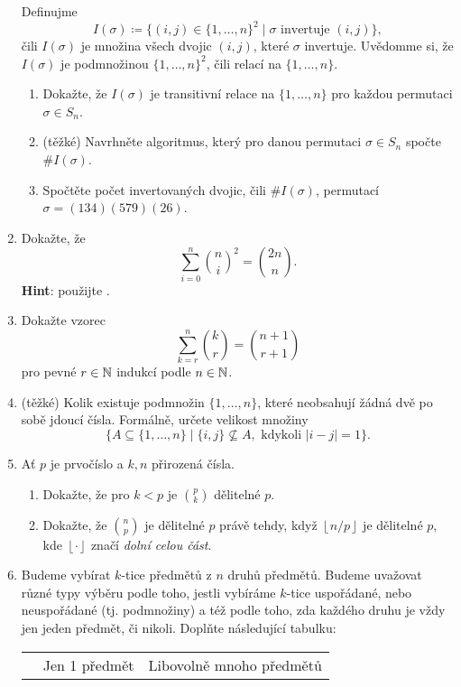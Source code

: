\begin{enumerate}
  Definujme
   \[
    I(\sigma) \coloneqq \{(i,j) \in \{1,\ldots,n\}^2 \mid \sigma \text{ invertuje
    } (i,j)\},
  \]
  čili $I(\sigma)$ je množina všech dvojic $(i,j)$, které $\sigma$ invertuje.
  Uvědomme si, že $I(\sigma)$ je podmnožinou $\{1,\ldots,n\}^2$, čili relací na
  $\{1,\ldots,n\}$.
  \begin{enumerate}
   \item Dokažte, že $I(\sigma)$ je transitivní relace na $\{1,\ldots,n\}$ pro
    každou permutaci $\sigma \in S_n$.
   \item (těžké) Navrhněte algoritmus, který pro danou permutaci $\sigma \in
    S_n$ spočte $\# I(\sigma)$.
   \item Spočtěte počet invertovaných dvojic, čili $\# I(\sigma)$, permutací
    $\sigma = (134)(579)(26)$.
  \end{enumerate}
 \item Dokažte, že
  \[
   \sum_{i=0}^{n} \binom{n}{i}^2 = \binom{2n}{n}.
  \]
  \textbf{Hint}: použijte .
 \item Dokažte vzorec
  \[
   \sum_{k=r}^{n} \binom{k}{r} = \binom{n+1}{r+1}
  \]
  pro pevné $r \in \mathbb{N}$ indukcí podle $n \in \mathbb{N}$.
 \item(těžké) Kolik existuje podmnožin $\{1,\ldots,n\}$, které neobsahují žádná
  dvě po sobě jdoucí čísla. Formálně, určete velikost množiny
  \[
   \{A \subseteq \{1,\ldots,n\} \mid \{i,j\} \nsubseteq A, \text{ kdykoli }
   |i-j|=1\}.
  \]
 \item Ať $p$ je prvočíslo a $k,n$ přirozená čísla.
  \begin{enumerate}
   \item Dokažte, že pro $k<p$ je $\binom{p}{k}$ dělitelné $p$.
   \item Dokažte, že $\binom{n}{p}$ je dělitelné $p$ právě tehdy, když
    $\left\lfloor n / p \right\rfloor$ je dělitelné $p$, kde $\left\lfloor \cdot
    \right\rfloor$ značí \emph{dolní celou část}.
  \end{enumerate}
 \item Budeme vybírat $k$-tice předmětů z $n$ druhů předmětů. Budeme uvažovat
  různé typy výběru podle toho, jestli vybíráme $k$-tice uspořádané, nebo
  neuspořádané (tj. podmnožiny) a též podle toho, zda každého druhu je vždy jen
  jeden předmět, či nikoli. Doplňte následující tabulku:
  \begin{table}[h]
   \centering
   \begin{tabular}{c|c|c}
    & Jen 1 předmět & Libovolně mnoho předmětů\\

\end{tabular}
\end{table}
\end{enumerate}

